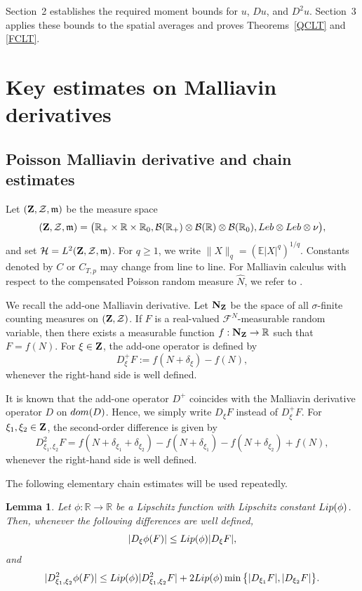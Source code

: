 \documentclass[10pt,a4paper]{amsart}
\newtheorem{lemma}[theorem]{Lemma}
\def\cB{\mathcal{B}}
\def\cF{\mathcal{F}}
\def\cH{\mathcal{H}}
\def\cZ{\mathcal{Z}}
\def\bE{\mathbb{E}}
\def\bR{\mathbb{R}}
\newcommand{\fm}{\mathfrak{m}}
\begin{document}
Section~2 establishes the required moment bounds for $u$, $Du$, and
$D^2u$. Section~3 applies these bounds to the spatial averages and proves
Theorems~\ref{QCLT} and \ref{FCLT}.


\section{Key estimates on Malliavin derivatives}
\subsection{Poisson Malliavin derivative and chain estimates}
Let $({\bf Z},\cZ,\fm)$ be the measure space
\[
({\bf Z},\cZ,\fm)
=\big(\bR_+\times\bR\times\bR_0,
\cB(\bR_+)\otimes\cB(\bR)\otimes\cB(\bR_0),
{\rm Leb}\otimes{\rm Leb}\otimes\nu\big),
\]
 and set $\cH=L^2({\bf Z},\cZ,\fm)$. For $q\ge1$, we write
$\|X\|_q=(\bE|X|^q)^{1/q}$. Constants denoted by $C$ or $C_{T,p}$ may
change from line to line. For Malliavin calculus with respect to the
compensated Poisson random measure $\widehat N$, we refer to \cite{NN18}.

\medskip

We recall the add-one Malliavin derivative. Let ${\bf N}_{\bf Z}$ be the space of all $\sigma$-finite counting measures
on $({\bf Z},\cZ)$. If $F$ is a real-valued $\cF^N$-measurable random
variable, then there exists a measurable function
$f:{\bf N}_{\bf Z}\to\bR$ such that $F=f(N)$. For $\xi\in{\bf Z}$, the
add-one operator is defined by
\begin{equation}
\label{add-one}
D_\xi^+F
:=
f(N+\delta_\xi)-f(N),
\end{equation}
whenever the right-hand side is well defined. 

It is known that the add-one operator $D^+$ coincides with the Malliavin
derivative operator $D$ on ${\rm dom}(D)$. Hence, we simply
write $D_\xi F$ instead of $D_\xi^+F$. For $\xi_1,\xi_2\in{\bf Z}$, the
second-order difference is given by
\begin{equation}
\label{second-add-one}
D^2_{\xi_1,\xi_2}F
=
f(N+\delta_{\xi_1}+\delta_{\xi_2})
-
f(N+\delta_{\xi_1})
-
f(N+\delta_{\xi_2})
+
f(N),
\end{equation}
whenever the right-hand side is well defined.

The following elementary chain estimates will be used repeatedly.

\begin{lemma}
\label{lem:chain-estimates}
Let $\phi:\bR\to\bR$ be a Lipschitz function with Lipschitz constant
${\rm Lip}(\phi)$. Then, whenever the following differences are well defined,
\begin{equation}
\label{D-chain}
|D_\xi\phi(F)|
\le
{\rm Lip}(\phi)|D_\xi F|,
\end{equation}
and
\begin{equation}
\label{D2-chain}
|D^2_{\xi_1,\xi_2}\phi(F)|
\le
{\rm Lip}(\phi)|D^2_{\xi_1,\xi_2}F|
+
2{\rm Lip}(\phi)
\min\big\{
|D_{\xi_1}F|,
|D_{\xi_2}F|
\big\}.
\end{equation}
\end{lemma}
\end{document}
